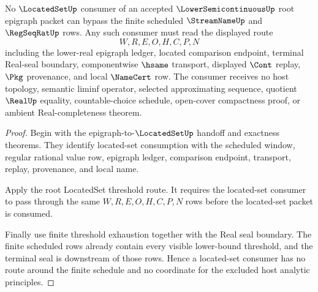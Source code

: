 \begin{theorem}
\label{thm:lower-semicontinuous-root-locatedset-nonescape}
No $\LocatedSetUp$ consumer of an accepted $\LowerSemicontinuousUp$ root epigraph packet can bypass the finite scheduled $\StreamNameUp$ and $\RegSeqRatUp$ rows. Any such consumer must read the displayed route
$$
W,R,E,O,H,C,P,N
$$
including the lower-real epigraph ledger, located comparison endpoint, terminal Real-seal boundary, componentwise $\hsame$ transport, displayed $\Cont$ replay, $\Pkg$ provenance, and local $\NameCert$ row. The consumer receives no host topology, semantic liminf operator, selected approximating sequence, quotient $\RealUp$ equality, countable-choice schedule, open-cover compactness proof, or ambient Real-completeness theorem.
\end{theorem}
\begin{proof}
Begin with the epigraph-to-$\LocatedSetUp$ handoff and exactness theorems. They identify located-set consumption with the scheduled window, regular rational value row, epigraph ledger, comparison endpoint, transport, replay, provenance, and local name.

Apply the root LocatedSet threshold route. It requires the located-set consumer to pass through the same $W,R,E,O,H,C,P,N$ rows before the located-set packet is consumed.

Finally use finite threshold exhaustion together with the Real seal boundary. The finite scheduled rows already contain every visible lower-bound threshold, and the terminal seal is downstream of those rows. Hence a located-set consumer has no route around the finite schedule and no coordinate for the excluded host analytic principles.
\end{proof}

